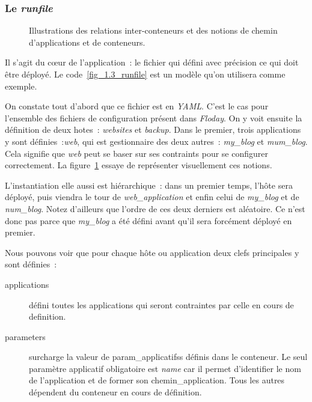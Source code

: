 \subsubsection{Le \emph{runfile}}

\begin{figure}
	\centerfloat
	\caption{Illustrations des relations inter-conteneurs et des notions de chemin d'applications et de conteneurs.}
	\label{relation_conteneurs}
	
\end{figure}


Il s'agit du cœur de l'application~: le fichier qui défini avec précision ce qui doit être déployé.
Le code~\ref{fig_1.3_runfile} est un modèle qu'on utilisera comme exemple.

On constate tout d'abord que ce fichier est en \emph{YAML}.
C'est le cas pour l'ensemble des fichiers de configuration présent dans \emph{Floday}.
On y voit ensuite la définition de deux \glspl{hote}~: \emph{websites} et \emph{backup}.
Dans le premier, trois \glspl{application} y sont définies~:\emph{web}, qui est \gls{gestionnaire} des deux autres~: \emph{my\_blog} et \emph{mum\_blog}.
Cela signifie que \emph{web} peut se baser sur ses \glspl{contraint} pour se configurer correctement.
La figure~\ref{relation_conteneurs} essaye de représenter visuellement ces notions.

L'\gls{instantiation} elle aussi est hiérarchique~: dans un premier temps, l'hôte sera déployé, puis viendra le tour de \emph{web\_application} et enfin celui de \emph{my\_blog} et de \emph{num\_blog}.
Notez d'ailleurs que l'ordre de ces deux derniers est aléatoire.
Ce n'est donc pas parce que \emph{my\_blog} a été défini avant qu'il sera forcément déployé en premier.

Nous pouvons voir que pour chaque hôte ou application deux clefs principales y sont définies~:
\begin{description}
	\item[applications] défini toutes les applications qui seront contraintes par celle en cours de \gls{definition}.
	\item[parameters] surcharge la valeur de \glspl{param_applicatifs} définis dans le conteneur.
		Le seul paramètre applicatif obligatoire est \emph{name} car il permet d'identifier le nom de l'application et de former son \gls{chemin_application}.
		Tous les autres dépendent du conteneur en cours de définition.
\end{description}

